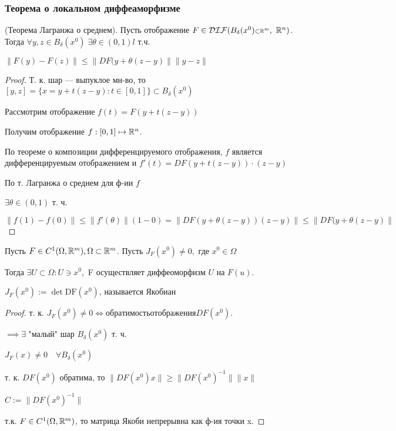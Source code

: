 \subsubsection{Теорема о локальном диффеаморфизме}
\begin{theorem} (Теорема Лагранжа о среднем). \;
    Пусть отображение $F \in \mathcal{DIF}(B_\delta (x^0) {\scriptstyle \subset \mathbb{R}^m},\ \mathbb{R}^n)$. Тогда $\forall y, z \in B_\delta (x^0)\; \exists \theta \in (0, 1)l$ т.ч.

    $\|F(y) - F(z)\| \leqslant \|DF(y + \theta(z - y)\| \|y - z\|$
\end{theorem}
\begin{proof}


    Т. к. шар — выпуклое мн-во, то $[y, z] = \{x = y + t(z - y) : t \in [0, 1]\} \subset B_\delta(x^0)$

    Рассмотрим отображение $f(t) = F(y + t(z - y))$

    Получим отображение $f: [0, 1] \mapsto \mathbb{R}^n$.

    По теореме о композиции дифференцируемого отображения, $f$ является дифференцируемым отображением и $f'(t) = DF(y + t(z - y)) \cdot (z - y)$

    По т. Лагранжа о среднем для ф-ии $f$

    $\exists \theta \in (0, 1)$ т. ч.

    $\|f(1) - f(0)\| \leqslant \|f'(\theta)\|(1 - 0) = \|DF(y + \theta(z - y))(z - y)\| \leqslant \|DF(y + \theta(z - y)\|$
\end{proof}
\begin{theorem}
    Пусть $F \in C^1(\Omega, \mathbb{R}^m), \Omega \subset \mathbb{R}^m$. Пусть $J_F(x^0) \neq 0,$ где $x^0 \in \Omega$

    Тогда $\exists U \subset \Omega: U \ni x^0,$ F осуществляет диффеоморфизм $U$ на $F(u)$.
    \begin{note}
        $J_F(x^0) := \det \mathrm{DF}(x^0)$, называется Якобиан
    \end{note}
\end{theorem}
\begin{proof}
    т. к. $J_F(x^0) \neq 0 \Longleftrightarrow обратимость отображения DF(x^0)$.

    $\implies \exists$ "малый" шар $B_\delta(x^0)$ т. ч.

    $J_F(x) \neq 0 \quad \forall B_\delta(x^0)$

    т. к. $DF(x^0) \text{ обратима, то } \|DF(x^0)x\| \geqslant \|DF(x^0)^{-1}\| \|x\|$

    $C := \|DF(x^0)^{-1}\|$

    т.к. $F \in C^1(\Omega, \mathbb{R}^m)$, то матрица Якоби непрерывна как ф-ия точки x.
\end{proof}